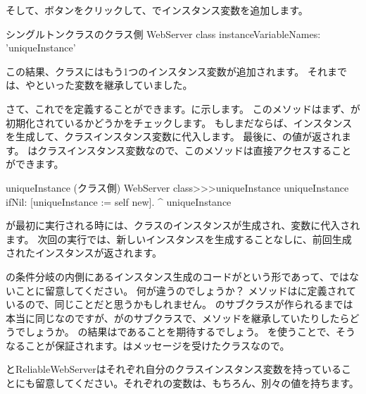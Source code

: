 \documentclass[a4paper,10pt,twoside]{book}
\begin{document}
そして、ボタンをクリックして、でインスタンス変数を追加します。

\begin{classdef}[webserver]{シングルトンクラスのクラス側}
WebServer class 	
	instanceVariableNames: 'uniqueInstance'
\end{classdef}

この結果、クラスにはもう1つのインスタンス変数が追加されます。
それまでは、やといった変数を継承していました。

さて、これでを定義することができます。に示します。
このメソッドはまず、が初期化されているかどうかをチェックします。
もしまだならば、インスタンスを生成して、クラスインスタンス変数に代入します。
最後に、の値が返されます。
はクラスインスタンス変数なので、このメソッドは直接アクセスすることができます。
    
\begin{method}[uniqueInstance]{uniqueInstance (クラス側)}
WebServer class>>>uniqueInstance
     uniqueInstance ifNil: [uniqueInstance := self new].
     ^ uniqueInstance
\end{method}

が最初に実行される時には、クラスのインスタンスが生成され、変数に代入されます。
次回の実行では、新しいインスタンスを生成することなしに、前回生成されたインスタンスが返されます。

の条件分岐の内側にあるインスタンス生成のコードがという形であって、ではないことに留意してください。
何が違うのでしょうか？
メソッドはに定義されているので、同じことだと思うかもしれません。
のサブクラスが作られるまでは本当に同じなのですが、がのサブクラスで、メソッドを継承していたりしたらどうでしょうか。
の結果はであることを期待するでしょう。
\self を使うことで、そうなることが保証されます。\self はメッセージを受けたクラスなので。

と{ReliableWebServer}はそれぞれ自分のクラスインスタンス変数を持っていることにも留意してください。それぞれの変数は、もちろん、別々の値を持ちます。

\end{document}
